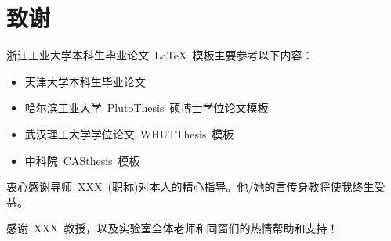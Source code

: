 

\setlength{\parskip}{18pt}
\chapter*{\centering\xiaoer\hei 致\quad 谢}
\setlength{\parskip}{18pt}
\setlength{\parskip}{0pt}

浙江工业大学本科生毕业论文~\LaTeX~模板主要参考以下内容：
\begin{itemize}
  \item 天津大学本科生毕业论文
  \item 哈尔滨工业大学~PlutoThesis~硕博士学位论文模板
  \item 武汉理工大学学位论文~WHUTThesis~模板
  \item 中科院~CASthesis~模板
\end{itemize}

\vspace*{1em}

衷心感谢导师~XXX~(职称)对本人的精心指导。他/她的言传身教将使我终生受益。

感谢~XXX~教授，以及实验室全体老师和同窗们的热情帮助和支持！




